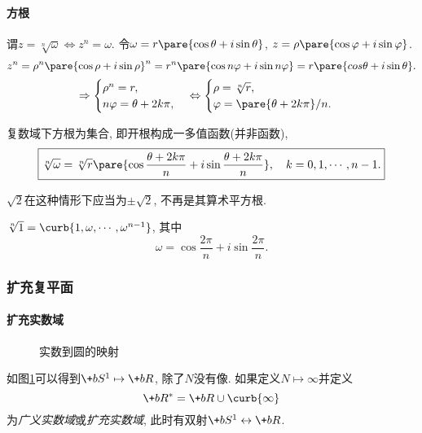 \documentclass{ctexart}
\begin{document}
\paragraph{方根} %
\label{par:方根}

谓$z = \sqrt[n]{\omega}\Leftrightarrow z^n = \omega$. 令$\omega = r\pare{\cos\theta + i\sin\theta}$, $z = \rho\pare{\cos\varphi + i\sin\varphi}$.
\[ z^n = \rho^n\pare{\cos\rho+i\sin\rho}^n = r^n\pare{\cos n\varphi + i\sin n\varphi} = r\pare{cos\theta + i\sin\theta}. \]
\[ \Rightarrow \begin{cases}
    \rho^n = r,\\
    n\varphi = \theta + 2k\pi,
\end{cases}\Leftrightarrow \begin{cases}
    \rho = \sqrt[n]{r},\\
    \varphi = \pare{\theta+2k\pi}/n.
\end{cases} \]
\begin{theorem}[方根]
    复数域下方根为集合, 即开根构成一多值函数(并非函数),
    \[ \boxed{\sqrt[n]{\omega} = \sqrt[n]{r} \pare{\cos \frac{\theta+2k\pi}{n} + i\sin \frac{\theta + 2k\pi}{n}},\quad k = 0, 1, \cdots, n-1.} \]
\end{theorem}
\begin{remark}
    $\sqrt{2}$在这种情形下应当为$\pm \sqrt{2}$, 不再是其算术平方根.
\end{remark}
\begin{ex}
    $\sqrt[n]{1} = \curb{1,\omega,\cdots,\omega^{n-1}}$, 其中
    \[ \omega = \cos \frac{2\pi}{n} + i\sin \frac{2\pi}{n}. \]
\end{ex}


\subsubsection{扩充复平面} %
\label{ssub:扩充复平面}

\paragraph{扩充实数域} %
\label{par:扩充实数域}

\begin{figure}[ht]
    \centering
    \caption{实数到圆的映射}
    \label{fig:实数到圆的映射}
\end{figure}
如图\cref{fig:实数到圆的映射}可以得到$\+bS^1\mapsto \+bR$, 除了$N$没有像. 如果定义$N\mapsto \infty$并定义
\[ \+bR^* = \+bR\cup\curb{\infty} \]
为\emph{广义实数域}或\emph{扩充实数域}, 此时有双射$\+bS^1\leftrightarrow \+bR$. 
\end{document}
